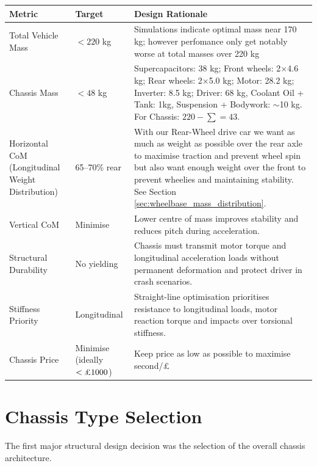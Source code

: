 \begin{table}[H]
\centering
\label{tab:performance_targets}
\footnotesize
\singlespacing
\begin{tabularx}{\textwidth}{|p{3.2cm}|p{2.2cm}|X|}
\hline
\textbf{Metric} & \textbf{Target} & \textbf{Design Rationale} \\
\hline
Total Vehicle Mass & $<220$ kg & Simulations indicate optimal mass near 170 kg; however perfomance only get notably worse at total masses over 220 kg \\
\hline
Chassis Mass & $<48$ kg & Supercapacitors: 38 kg; Front wheels: 2$\times$4.6 kg; Rear wheels: 2$\times$5.0 kg; Motor: 28.2 kg; Inverter: 8.5 kg; Driver: 68 kg, Coolant Oil + Tank: 1kg, Suspension + Bodywork: $\sim$10 kg. For Chassis: $220 - \sum = 43$. \\
\hline
Horizontal CoM (Longitudinal Weight Distribution) & 65--70\% rear & With our Rear-Wheel drive car we want as much as weight as possible over the rear axle to maximise traction and prevent wheel spin but also want enough weight over the front to prevent wheelies and maintaining stability. See Section \ref{sec:wheelbase_mass_distribution}.\\
\hline
Vertical CoM & Minimise & Lower centre of mass improves stability and reduces pitch during acceleration. \\
\hline
Structural Durability & No yielding & Chassis must transmit motor torque and longitudinal acceleration loads without permanent deformation and protect driver in crash scenarios. \\
\hline
Stiffness Priority & Longitudinal & Straight-line optimisation prioritises resistance to longitudinal loads, motor reaction torque and impacts over torsional stiffness. \\
\hline
Chassis Price & Minimise (ideally $<\text{\pounds}1000$) & Keep price as low as possible to maximise second/£ \\
\hline
\end{tabularx}
\end{table}
\vspace{-10pt}

\section{Chassis Type Selection}

The first major structural design decision was the selection of the overall chassis architecture. 

